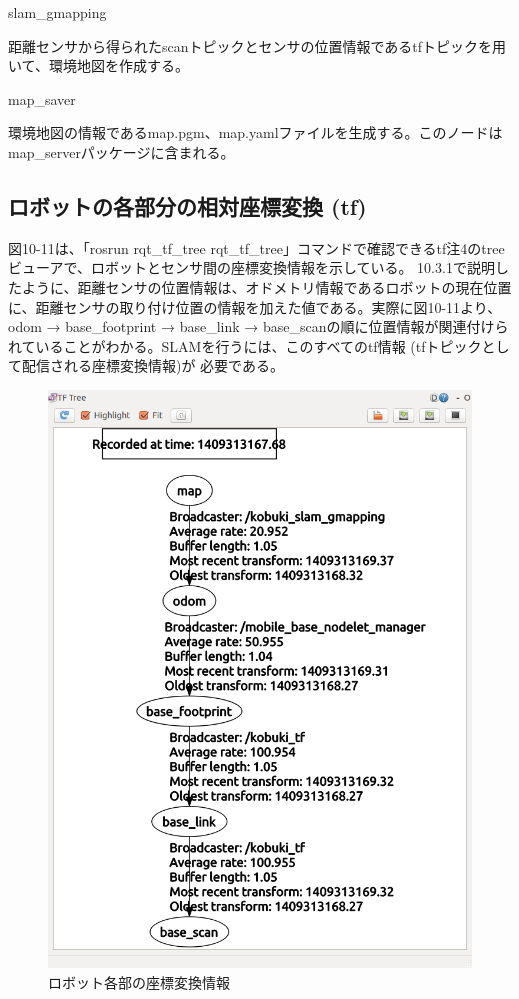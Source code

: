 \circled{\thenum} slam\_gmapping

距離センサから得られたscanトピックとセンサの位置情報であるtfトピックを用いて、環境地図を作成する。

\circled{\thenum} map\_saver

環境地図の情報であるmap.pgm、map.yamlファイルを生成する。このノードはmap\_serverパッケージに含まれる。

\subsection{ロボットの各部分の相対座標変換 (tf)}

図10-11は、「rosrun rqt\_tf\_tree rqt\_tf\_tree」コマンドで確認できるtf注4のtreeビューアで、ロボットとセンサ間の座標変換情報を示している。
10.3.1で説明したように、距離センサの位置情報は、オドメトリ情報であるロボットの現在位置に、距離センサの取り付け位置の情報を加えた値である。実際に図10-11より、odom → base\_footprint → base\_link → base\_scanの順に位置情報が関連付けられていることがわかる。SLAMを行うには、このすべてのtf情報 (tfトピックとして配信される座標変換情報)が  必要である。

\begin{figure}[htp]
  \centering
  \includegraphics[width=\columnwidth]{pictures/chapter10/pic_10_11.png}
  \caption{ロボット各部の座標変換情報}
\end{figure}

